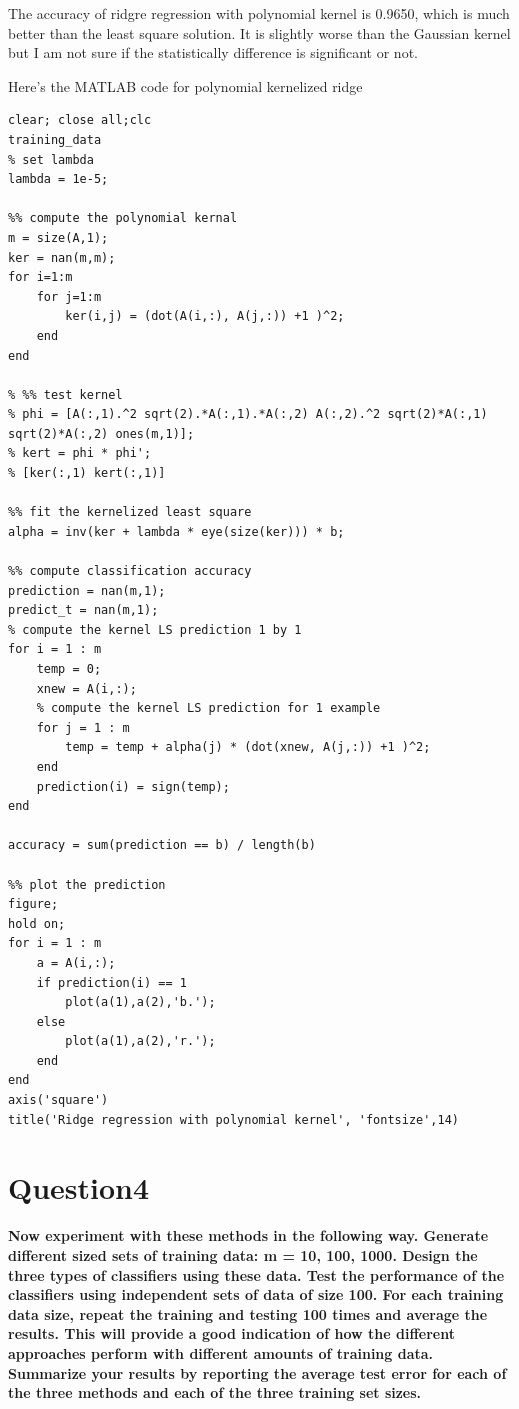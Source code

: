 \documentclass[paper=a4, fontsize=11pt]{scrartcl} %
\numberwithin{equation}{section} %
\numberwithin{figure}{section} %
\numberwithin{table}{section} %
\begin{document}
The accuracy of ridgre regression with polynomial kernel is 0.9650, which is much better than the least square solution. It is slightly worse than the Gaussian kernel but I am not sure if the statistically difference is significant or not.


\newpage
Here's the MATLAB code for polynomial kernelized ridge 
\begin{lstlisting}
clear; close all;clc
training_data
% set lambda
lambda = 1e-5;

%% compute the polynomial kernal
m = size(A,1);
ker = nan(m,m);
for i=1:m
    for j=1:m
        ker(i,j) = (dot(A(i,:), A(j,:)) +1 )^2;
    end
end

% %% test kernel 
% phi = [A(:,1).^2 sqrt(2).*A(:,1).*A(:,2) A(:,2).^2 sqrt(2)*A(:,1) sqrt(2)*A(:,2) ones(m,1)];
% kert = phi * phi';
% [ker(:,1) kert(:,1)]

%% fit the kernelized least square
alpha = inv(ker + lambda * eye(size(ker))) * b;

%% compute classification accuracy
prediction = nan(m,1);
predict_t = nan(m,1);
% compute the kernel LS prediction 1 by 1
for i = 1 : m
    temp = 0; 
    xnew = A(i,:);
    % compute the kernel LS prediction for 1 example
    for j = 1 : m
        temp = temp + alpha(j) * (dot(xnew, A(j,:)) +1 )^2;
    end
    prediction(i) = sign(temp);
end

accuracy = sum(prediction == b) / length(b)

%% plot the prediction 
figure; 
hold on;
for i = 1 : m
    a = A(i,:);
    if prediction(i) == 1
        plot(a(1),a(2),'b.');
    else
        plot(a(1),a(2),'r.');
    end
end
axis('square')
title('Ridge regression with polynomial kernel', 'fontsize',14)
\end{lstlisting}


\newpage
\section*{Question4}
\textbf{Now experiment with these methods in the following way. Generate different sized sets of training data: m = 10, 100, 1000. Design the three types of classifiers using these data. Test the performance of the classifiers using independent sets of data of size 100. For each training data size, repeat the training and testing 100 times and average the results. This will provide a good indication of how the different approaches perform with different amounts of training data. Summarize your results by reporting the average test error for each of the three methods and each of the three training set sizes.}\\
\end{document}
